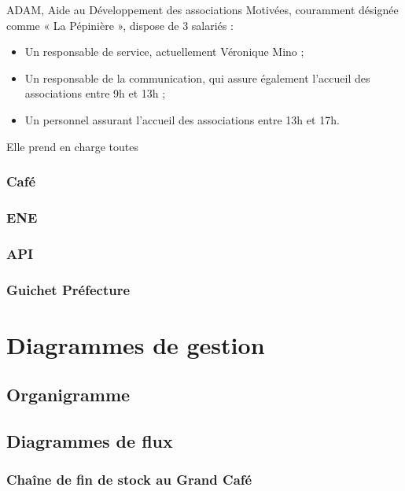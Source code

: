 ADAM, Aide au Développement des associations Motivées, couramment désignée comme « La Pépinière », dispose de 3 salariés :
\begin{itemize}
\item Un responsable de service, actuellement Véronique Mino ;
\item Un responsable de la communication, qui assure également l'accueil des associations entre 9h et 13h ;
\item Un personnel assurant l'accueil des associations entre 13h et 17h.
\end{itemize}

Elle prend en charge toutes

\subsubsection{Café}

\subsubsection{ENE}

\subsubsection{API}

\subsubsection{Guichet Préfecture}

\section{Diagrammes de gestion}
\subsection{Organigramme}
\subsection{Diagrammes de flux}
\subsubsection{Chaîne de fin de stock au Grand Café}

